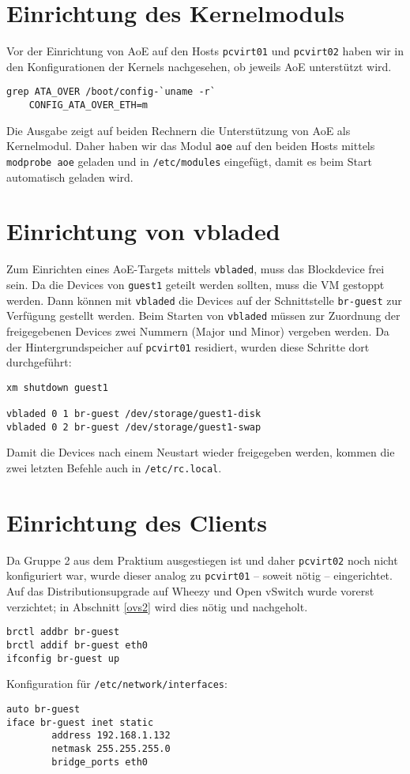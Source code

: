 \section{Einrichtung des Kernelmoduls}
Vor der Einrichtung von AoE auf den Hosts \verb#pcvirt01# und \verb#pcvirt02# haben wir in den Konfigurationen der Kernels nachgesehen, ob jeweils AoE unterstützt wird. 
\setupVerbatimOut
\begin{verbatim}
grep ATA_OVER /boot/config-`uname -r`
    CONFIG_ATA_OVER_ETH=m
\end{verbatim} 
Die Ausgabe zeigt auf beiden Rechnern die Unterstützung von AoE als Kernelmodul. Daher haben wir das Modul \verb#aoe# auf den beiden Hosts mittels \verb#modprobe aoe# geladen und  in \verb#/etc/modules# eingefügt, damit es beim Start automatisch geladen wird. 

\section{Einrichtung von vbladed}
Zum Einrichten eines AoE-Targets mittels \verb#vbladed#, muss das Blockdevice frei sein. Da die Devices von \verb#guest1# geteilt werden sollten, muss die VM gestoppt werden. Dann können mit \verb#vbladed# die Devices auf der Schnittstelle \verb#br-guest# zur Verfügung gestellt werden. Beim Starten von \verb#vbladed# müssen zur Zuordnung der freigegebenen Devices zwei Nummern (Major und Minor) vergeben werden. Da der Hintergrundspeicher auf \verb#pcvirt01# residiert, wurden diese Schritte dort durchgeführt:
\setupVerbatimOut
\begin{verbatim}
xm shutdown guest1

vbladed 0 1 br-guest /dev/storage/guest1-disk  
vbladed 0 2 br-guest /dev/storage/guest1-swap
\end{verbatim}
Damit die Devices nach einem Neustart wieder freigegeben werden, kommen die zwei letzten Befehle auch in \verb#/etc/rc.local#. 
\section{Einrichtung des Clients}
Da Gruppe 2 aus dem Praktium ausgestiegen ist und daher \verb#pcvirt02# noch nicht konfiguriert war, wurde dieser analog zu \verb#pcvirt01#  -- soweit nötig -- eingerichtet. Auf das Distributionsupgrade auf Wheezy und Open vSwitch wurde vorerst verzichtet; in Abschnitt \ref{ovs2} wird dies nötig und nachgeholt.
\begin{verbatim}
brctl addbr br-guest
brctl addif br-guest eth0
ifconfig br-guest up
\end{verbatim}
Konfiguration für \verb#/etc/network/interfaces#:
\setupVerbatimOut
\begin{verbatim}
auto br-guest
iface br-guest inet static
        address 192.168.1.132
        netmask 255.255.255.0
        bridge_ports eth0
\end{verbatim}

